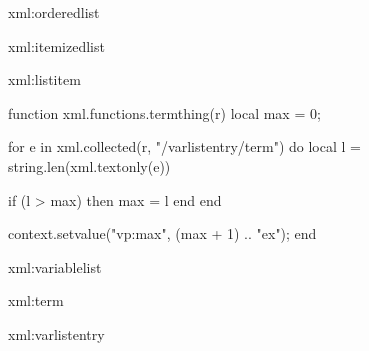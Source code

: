 
\startxmlsetups xml:orderedlist
	\startitemize[n]
	\stopitemize
\stopxmlsetups

\startxmlsetups xml:itemizedlist
	\startitemize[1]
	\stopitemize
\stopxmlsetups

\startxmlsetups xml:listitem
	\item
\stopxmlsetups

\startluacode
function xml.functions.termthing(r)
	local max = 0;

	for e in xml.collected(r, "/varlistentry/term") do
		local l = string.len(xml.textonly(e))

		if (l > max) then
			max = l
		end
	end

	context.setvalue("vp:max", (max + 1) .. "ex");
end
\stopluacode

\startxmlsetups xml:variablelist
	\crlf %



	\setupparagraphs[vp][1][width=\getvalue{vp:max}]
	\setupparagraphs[vp][2][width=]


	\crlf %
\stopxmlsetups

\startxmlsetups xml:term
\stopxmlsetups

\startxmlsetups xml:varlistentry

\setupwhitespace[big]

\startvp
	\bf {}
\vp
\stopvp

\stopxmlsetups

